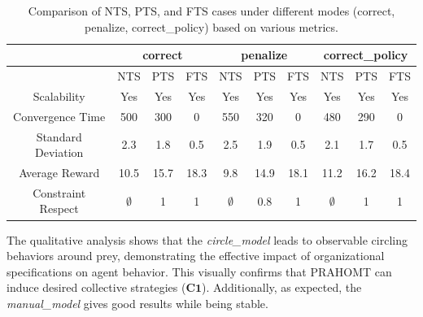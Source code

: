 \documentclass[runningheads]{llncs}
\theoremstyle{freethm}
\theoremstyle{proofoutline}
\begin{document}
\begin{table}[h!]
    \centering
    \setlength{\tabcolsep}{5pt}
    \begin{tabular}{cccccccccc}
        \hline
                           & \multicolumn{3}{c}{correct} & \multicolumn{3}{c}{penalize} & \multicolumn{3}{c}{correct\_policy}                                                         \\
        \hline
                           & NTS                         & PTS                          & FTS                                 & NTS         & PTS  & FTS  & NTS         & PTS  & FTS  \\
        \hline
        Scalability        & Yes                         & Yes                          & Yes                                 & Yes         & Yes  & Yes  & Yes         & Yes  & Yes  \\
        Convergence Time   & 500                         & 300                          & 0                                   & 550         & 320  & 0    & 480         & 290  & 0    \\
        Standard Deviation & 2.3                         & 1.8                          & 0.5                                 & 2.5         & 1.9  & 0.5  & 2.1         & 1.7  & 0.5  \\
        Average Reward     & 10.5                        & 15.7                         & 18.3                                & 9.8         & 14.9 & 18.1 & 11.2        & 16.2 & 18.4 \\
        Constraint Respect & $\emptyset$                 & 1                            & 1                                   & $\emptyset$ & 0.8  & 1    & $\emptyset$ & 1    & 1    \\
    \end{tabular}

    \caption{Comparison of NTS, PTS, and FTS cases under different modes (correct, penalize, correct\_policy) based on various metrics.}\label{tab:results}
\end{table}


The qualitative analysis shows that the \textit{circle\_model} leads to observable circling behaviors around prey, demonstrating the effective impact of organizational specifications on agent behavior. This visually \footnotemark[2] confirms that PRAHOMT can induce desired collective strategies ($\mathbf{C1}$). Additionally, as expected, the \textit{manual\_model} gives good results while being stable.

\end{document}

